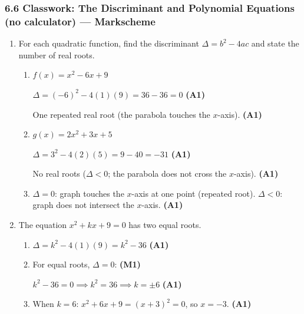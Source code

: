 \documentclass[12pt, twoside]{article}
\begin{document}
\subsubsection*{6.6 Classwork: The Discriminant and Polynomial Equations (no calculator) --- Markscheme}

\begin{enumerate}[itemsep=0.15cm]

\item[1.] [Maximum mark: 5]

For each quadratic function, find the discriminant $\Delta = b^2 - 4ac$
and state the number of real roots.

\begin{enumerate}[itemsep=0.3cm]
  \item $f(x) = x^2 - 6x + 9$

  $\Delta = (-6)^2 - 4(1)(9) = 36 - 36 = 0$ \hfill \textbf{(A1)}

  One repeated real root (the parabola touches the $x$-axis). \hfill \textbf{(A1)}

  \item $g(x) = 2x^2 + 3x + 5$

  $\Delta = 3^2 - 4(2)(5) = 9 - 40 = -31$ \hfill \textbf{(A1)}

  No real roots ($\Delta < 0$; the parabola does not cross the $x$-axis). \hfill \textbf{(A1)}

  \item $\Delta = 0$: graph touches the $x$-axis at one point (repeated root).
  $\Delta < 0$: graph does not intersect the $x$-axis. \hfill \textbf{(A1)}
\end{enumerate}

\item[2.] [Maximum mark: 6]

The equation $x^2 + kx + 9 = 0$ has two equal roots.

\begin{enumerate}[itemsep=0.3cm]
  \item $\Delta = k^2 - 4(1)(9) = k^2 - 36$ \hfill \textbf{(A1)}

  \item For equal roots, $\Delta = 0$: \hfill \textbf{(M1)}

  $k^2 - 36 = 0 \implies k^2 = 36 \implies k = \pm 6$ \hfill \textbf{(A1)}

  \item When $k = 6$: $x^2 + 6x + 9 = (x + 3)^2 = 0$, so $x = -3$. \hfill \textbf{(A1)}


\end{enumerate}
\end{enumerate}
\end{document}
